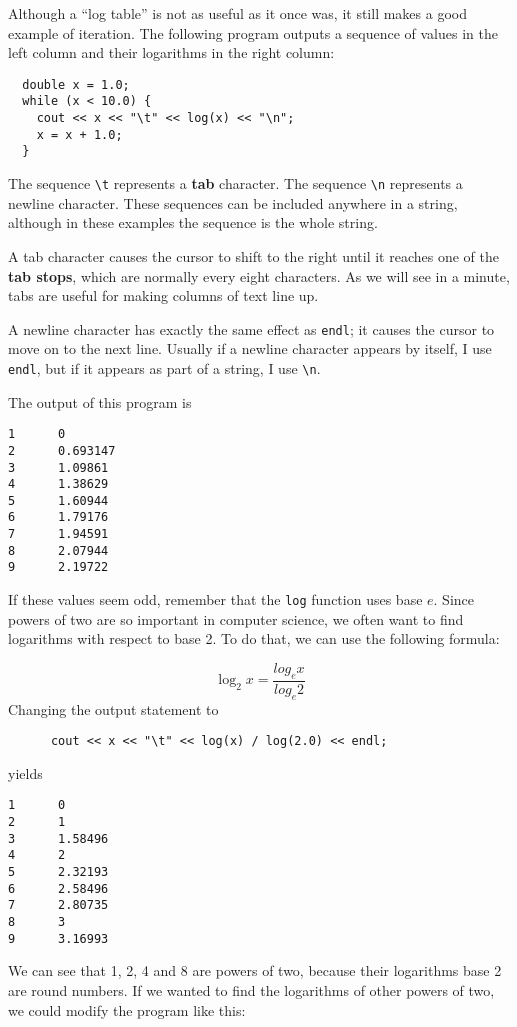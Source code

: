 Although a ``log table'' is not as useful as it once was, it still
makes a good example of iteration.  The following program outputs a
sequence of values in the left column and their logarithms in the
right column:

\begin{lstlisting}
  double x = 1.0;
  while (x < 10.0) {
    cout << x << "\t" << log(x) << "\n";
    x = x + 1.0;
  }
\end{lstlisting}
%
The sequence \verb+\t+ represents a {\bf tab} character.
The
sequence \verb+\n+ represents a newline character.  These sequences
can be included anywhere in a string, although in these examples
the sequence is the whole string.

A tab character causes the cursor to shift to the right until
it reaches one of the {\bf tab stops}, which are normally every
eight characters.  As we will see in a minute, tabs are useful
for making columns of text line up.

A newline character has exactly the same effect as {\tt endl};
it causes the cursor to move on to the next line.  Usually if
a newline character appears by itself, I use {\tt endl}, but
if it appears as part of a string, I use \verb+\n+.

The output of this program is

\begin{lstlisting}
1      0
2      0.693147
3      1.09861
4      1.38629
5      1.60944
6      1.79176
7      1.94591
8      2.07944
9      2.19722
\end{lstlisting}
%
If these values seem odd, remember that the {\tt log} function uses
base $e$.  Since powers of two are so important in computer science,
we often want to find logarithms with respect to base 2.  To do that,
we can use the following formula:

\[ \log_2 x = \frac {log_e x}{log_e 2} \]
%
Changing the output statement to

\begin{lstlisting}
      cout << x << "\t" << log(x) / log(2.0) << endl;
\end{lstlisting}
%
yields

\begin{lstlisting}
1      0
2      1
3      1.58496
4      2
5      2.32193
6      2.58496
7      2.80735
8      3
9      3.16993
\end{lstlisting}
%
We can see that 1, 2, 4 and 8 are powers of two, because
their logarithms base 2 are round numbers.  If we wanted to find
the logarithms of other powers of two, we could modify the
program like this:


